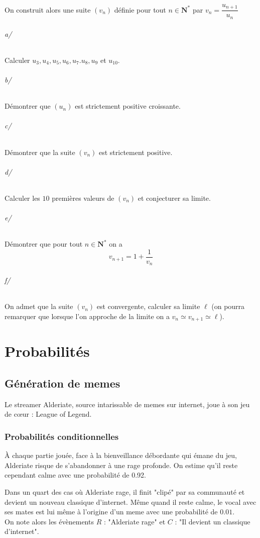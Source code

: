 		On construit alors une suite $(v_n)$ définie pour tout $n\in \mathbf{N}^*$ par $v_n = \dfrac{u_{n+1}}{u_n}$ \\
		
		\subparagraph{a/} Calculer $u_3, u_4, u_5, u_6, u_7. u_8, u_9$ et $u_{10}$.
		
		\subparagraph{b/} Démontrer que $(u_n)$ est strictement positive croissante.
		
		\subparagraph{c/} Démontrer que la suite $(v_n)$ est strictement positive.
		
		\subparagraph{d/} Calculer les $10$ premières valeurs de $(v_n)$ et conjecturer sa limite.
		
		\subparagraph{e/} Démontrer que pour tout $n\in \mathbf{N}^*$ on a 
		\[
			v_{n+1} = 1 + \frac{1}{v_n}
		\]
		
		\subparagraph{f/} On admet que la suite $(v_n)$ est convergente, calculer sa limite $\ell$ (on pourra remarquer que lorsque l'on approche de la limite on a $v_n \simeq v_{n+1} \simeq \ell$).
		
 


\chapter{Probabilités}


	\section{Génération de memes}
	
		Le streamer Alderiate, source intarissable de memes sur internet, joue à son jeu de cœur : League of Legend. 
		
		\subsection{Probabilités conditionnelles}
		
		À chaque partie jouée, face à la bienveillance débordante qui émane du jeu, Alderiate risque de s'abandonner à une rage profonde. On estime qu'il reste cependant calme avec une probabilité de 0.92.
		
		Dans un quart des cas où Alderiate rage, il finit "clipé" par sa communauté et devient un nouveau classique d'internet. Même quand il reste calme, le vocal avec ses mates est lui même à l'origine d'un meme avec une probabilité de $0.01$. \\
		
		On note alors les évènements $R$ : "Alderiate rage" et $C$ : "Il devient un classique d'internet". 
		
